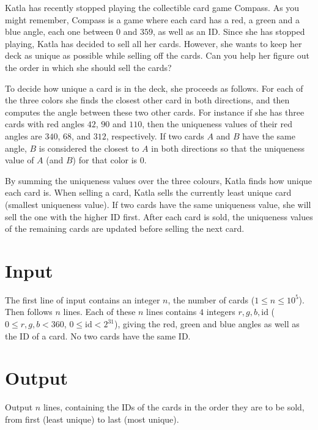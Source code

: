 
%
\noindent
Katla has recently stopped playing the collectible card game
Compass. As you might remember, Compass is a game where each card has
a red, a green and a blue angle, each one between $0$ and $359$, as
well as an ID. Since she has stopped playing, Katla has decided to sell all
her cards. However, she wants to keep her deck as unique as possible
while selling off the cards. Can you help her figure out the order in
which she should sell the cards?

To decide how unique a card is in the deck, she proceeds as follows.
For each of the three colors she finds the closest other card in both
directions, and then computes the angle between these two other cards.
For instance if she has three cards with red angles $42$, $90$ and
$110$, then the uniqueness values of their red angles are $340$, $68$,
and $312$, respectively.  If two cards $A$ and $B$ have the same
angle, $B$ is considered the closest to $A$ in both directions so that
the uniqueness value of $A$ (and $B$) for that color is $0$.

By summing the uniqueness values over the three colours, Katla finds
how unique each card is. When selling a card, Katla sells the currently
least unique card (smallest uniqueness value).  If two cards have the
same uniqueness value, she will sell the one with the higher ID first.
After each card is sold, the uniqueness values of the remaining cards
are updated before selling the next card.

\section*{Input}

The first line of input contains an integer $n$, the number of cards ($1 \le n \le 10^5$). Then follows $n$ lines. Each of these $n$ lines contains $4$ integers $r,
g, b, \text{id}$ ($0 \le r, g, b < 360$, $0 \le \text{id} <
2^{31}$), giving the red, green and blue angles as well as the ID of a
card.  No two cards have the same ID.

\section*{Output}

Output $n$ lines, containing the IDs of the cards in the order they are to be sold, from first
(least unique) to last (most unique).
